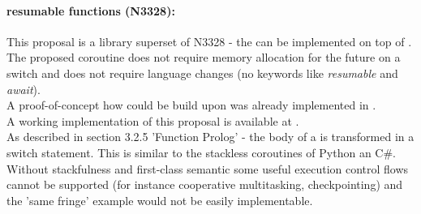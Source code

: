 \paragraph*{resumable functions (N3328\cite{n3328}):}
This proposal is a library superset of N3328 - the \resumfn can be implemented
on top of \coro. The proposed coroutine does not require memory allocation for
the future on a switch and does not require language changes (no keywords like
\textit{resumable} and \textit{await}).\\
A proof-of-concept how \await could be build upon \boostcoroutine was already
implemented in \awaitemu.\\
\newline
A working implementation of this proposal is available at \boostcoroutine.\\
As described in section 3.2.5 'Function Prolog' - the body of a \resumfn is
transformed in a switch statement. This is similar to the stackless coroutines
of Python an C\#.\\
\newline
Without stackfulness and first-class semantic some useful execution control
flows cannot be supported (for instance cooperative multitasking,
checkpointing) and the 'same fringe' example would not be easily implementable.
